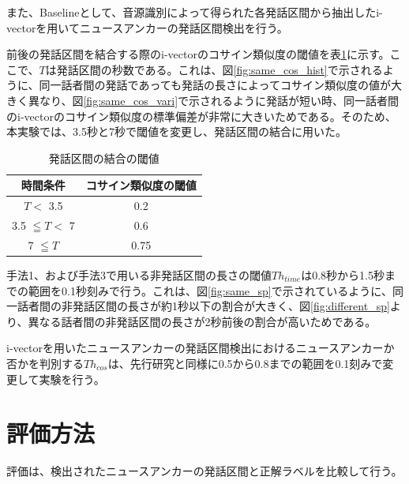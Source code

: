 また、Baselineとして、音源識別によって得られた各発話区間から抽出したi-vectorを用いてニュースアンカーの発話区間検出を行う。


前後の発話区間を結合する際のi-vectorのコサイン類似度の閾値を表\ref{table:decide_thcos}に示す。ここで、$T$は発話区間の秒数である。これは、図\ref{fig:same_cos_hist}で示されるように、同一話者間の発話であっても発話の長さによってコサイン類似度の値が大きく異なり、図\ref{fig:same_cos_vari}で示されるように発話が短い時、同一話者間のi-vectorのコサイン類似度の標準偏差が非常に大きいためである。そのため、本実験では、3.5秒と7秒で閾値を変更し、発話区間の結合に用いた。

\begin{table}[H]
  \begin{center}
    \caption{発話区間の結合の閾値 \label{table:decide_thcos}}
    \begin{tabular}{|c||c|} \hline
時間条件 & コサイン類似度の閾値  \\ \hline
$T <$ 3.5 &  0.2 \\ \hline
3.5 $\leqq T <$ 7 &  0.6  \\ \hline
7 $\leqq T$ &  0.75 \\ \hline
    \end{tabular}
  \end{center}
\end{table}

手法1、および手法3で用いる非発話区間の長さの閾値$Th_{time}$は0.8秒から1.5秒までの範囲を0.1秒刻みで行う。これは、図\ref{fig:same_sp}で示されているように、同一話者間の非発話区間の長さが約1秒以下の割合が大きく、図\ref{fig:different_sp}より、異なる話者間の非発話区間の長さが2秒前後の割合が高いためである。\par
i-vectorを用いたニュースアンカーの発話区間検出におけるニュースアンカーか否かを判別する$Th_{cos}$は、先行研究\cite{nozaki_gakuseikai}と同様に0.5から0.8までの範囲を0.1刻みで変更して実験を行う。\par

\section{評価方法}
評価は、検出されたニュースアンカーの発話区間と正解ラベルを比較して行う。

